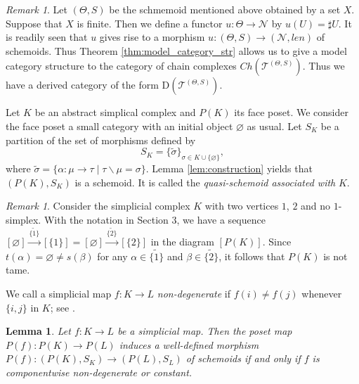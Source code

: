 \documentclass{amsart}
\newtheorem{lem}[thm]{Lemma}
\theoremstyle{definition}
\theoremstyle{remark}
\newtheorem{rem}[thm]{Remark}
\newcommand{\T}{{\mathcal T}}
\begin{document}
\begin{rem}\label{rem:height_functor}
Let $(\Theta, S)$ be the schmemoid mentioned above obtained by a set $X$. 
Suppose that $X$ is finite. Then we define a functor 
$u : \Theta \to {\mathcal N}$ by $u(U)= \sharp U$. %
It is readily seen that $u$ gives rise to a morphism 
$u : (\Theta, S) \to ({\mathcal N}, len)$ of schemoids. Thus Theorem \ref{thm:model_category_str}
allows us to give a model category structure to the category of chain complexes $Ch(\T^{(\Theta, S)})$. 
Thus we have a derived category of the form $\text{D}(\T^{(\Theta, S)})$. 
\end{rem}

Let $K$ be an abstract simplical complex and $P(K)$ its face poset. We consider the face poset 
a small category with an initial object $\varnothing$ as usual. Let $S_K$ be a partition of the set of morphisms defined by 
$$S_K = \{\widetilde{\sigma}\}_{\sigma \in K \cup \{\varnothing\}},$$ where 
$ \widetilde{\sigma} = \{ \alpha : \mu \to \tau \mid \tau\backslash \mu = \sigma\}$. Lemma \ref{lem:construction} yields that 
$(P(K), S_K)$ is a schemoid. It is called the {\it quasi-schemoid associated with} $K$. 

\begin{rem}\label{rem:not_tame}
Consider the simplicial complex $K$ with two vertices $1$, $2$ and no $1$-simplex. 
With the notation in Section 3,  we have a sequence  $[\varnothing] \stackrel{\widetilde{\{1\}}}{\longrightarrow} [\{1\}] = [\varnothing]
\stackrel{\widetilde{\{2\}}}{\longrightarrow} [\{2\}]$ in the diagram $[P(K)]$.  Since $t(\alpha) = \varnothing 
\neq s(\beta)$ for any $\alpha \in \widetilde{\{1\}}$ and $\beta \in \widetilde{\{2\}}$, it follows that 
$P(K)$ is not tame.
\end{rem}




We call a simplicial map $f : K \to L$ {\it non-degenerate} if $f(i) \neq f(j)$
whenever $\{i, j\}$ in $K$; see \cite[Definition 2.7]{B-P}.

\begin{lem} \label{lem:morphisms}
Let $f : K\to L$ be a simplicial map. 
Then the poset map $P(f) : P(K) \to P(L)$  
induces a well-defined morphism 
$P(f) : (P(K), S_K) \to (P(L), S_L)$ of schemoids if and only 
if $f$ is componentwise non-degenerate or constant.   
\end{lem}
\end{document}
